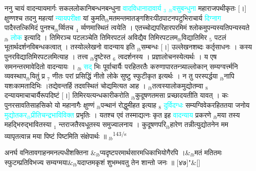 \documentclass[article,12pt,a4paper]{memoir}%
\newcommand{\quotelemma}[1]{\textcolor{cyan}{#1}}
\newcounter{parCount}
\begin{document}
	  
	  \pstart \leavevmode%
	\hphantom{.}ननु चायं वादन्यायमार्गः सकललोकानिबन्धनबन्धुना \quotelemma{वादविधानादावार्य {\tiny $_{3}$} {\tiny $_{lb}$}वसुबन्धुना} महाराजपथीकृतः [।] क्षुण्णश्च तदनु महत्यां \quotelemma{न्यायपरीक्षा} यां कुमति{\tiny $_{lb}$}मतमन्तमातङ्गशिरःपीठपाटनपटुभिराचार्य \quotelemma{दिग्नाग} पादैस्तत्किमिदं पुनश्च{\tiny $_{lb}$}र्व्वितच {\tiny $_{4}$} र्व्वणमास्थितं त्वयेति । एतच्चोद्यपरिहारपरमिमं श्लोकमुपन्यस्यतिपन्यस्यते {\tiny $_{lb}$} \quotelemma{लोक} \cite[20a8]{vn-msN} इत्यादि । तिमिरञ्च पटलञ्चेति तिमिरपटलं अविद्यैव तिमिरपटलम{\tiny $_{lb}$}विद्यातिमिर {\tiny $_{5}$} पटलं भूतार्थदर्शनविबन्धकत्वात् । तस्योल्लेखनो वादन्याय इति {\tiny $_{lb}$}सम्बन्धः [।] उल्लेखनशब्दः कर्तृसाधनः । कस्य पुनरविद्यातिमिरपटलमित्याह । तत्त्व {\tiny $_{lb}$}दृष्टेस्त {\tiny $_{6}$} त्वदर्शनस्य । प्रज्ञालोचनस्येत्यर्थः । य एष समनन्तरमावेदितो वादन्यायः । {\tiny $_{lb}$} \quotelemma{सद्} भिः पूर्वाचार्यैः परहितरतैः करुणापारतन्त्र्याल्लोकान् सम्यग्वर्त्त्मनि व्यवस्थाप{\tiny $_{lb}$}यितुं प्र {\tiny $_{7}$} णीतः परां प्रसिद्धिं नीतो लोके सुष्टु स्फुटीकृत इत्यर्थः । न तु परस्पर्द्धया {\tiny $_{lb}$}नापि यशःकामतादिभिः ।तद्येवन्तर्हि तदवस्थितं चोद्यमित्यत आह । {\tiny $_{lb}$}तत्वस्यालोकमुद्योतम्वा {\tiny $_{8}$} दन्यायमाचाचार्यैरूपदिष्टं [।] तिमिरयत्यन्धकारीकरोति {\tiny $_{lb}$}कुदूषणतमसा प्रच्छादयतीति यावत् । कः पुनरसावतिसाहसिको यो महानागैः क्षुण्णं {\tiny $_{lb}$}पन्थानं रोद्धुमीहत इत्याह {\tiny $_{8}$} \leavevmode{} \quotelemma{दुर्विदग्धः} सम्यग्विवेकरहिततया जनोय \quotelemma{मुद्योतकर{\tiny $_{lb}$}प्रीतिचन्द्र\edtext{}{\lemma{न्द्र}\Bfootnote{?}}भाविविक्त} प्रभृतिः । यतश्च एवं तस्माद्यत्नः कृत इह \quotelemma{वादन्याय} प्रकरणे {\tiny $_{lb}$}मया तस्य महद्भिरुद्भावितस्या {\tiny $_{1}$} न्तराजतैरवधूतस्य समुज्वालनाय । कुदूषणपरि{\tiny $_{lb}$}हारेण तन्नीत्युद्योतनेन मम व्यापृतत्वान्न मया पिष्टं पिष्टमिति संक्षेपार्थः ॥
	{}
	\pend%
      {\tiny $_{lb}$}\textsuperscript{\textenglish{143/s}}
	  \bigskip
	  \begingroup
	
	    
	    \stanza[\smallbreak]
	  अनर्घ  वनितावगाहनमनल्पधीशक्तिना &{\tiny $_{lb}$}प्यदृष्टपरमार्थसारमधिकाभियोगैरपि ।&{\tiny $_{lb}$}मतं मतितमः स्फुटम्प्रतिविभज्य सम्यग्मया&{\tiny $_{lb}$}यदाप्तमकृशं शुभम्भवतु तेन शान्तो जनः ॥ [४७]{\normalfontlatin\large\qquad{}"}\&[\smallbreak]
	  
\end{document}
